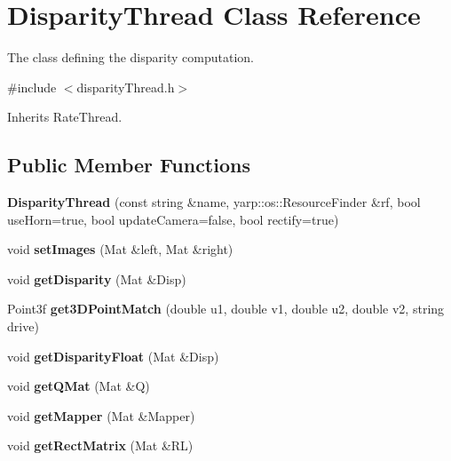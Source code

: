 \section{Disparity\+Thread Class Reference}
\label{classDisparityThread}


The class defining the disparity computation.  




{\ttfamily \#include $<$disparity\+Thread.\+h$>$}



Inherits Rate\+Thread.

\subsection*{Public Member Functions}
\begin{DoxyCompactItemize}
\item 
{\bfseries Disparity\+Thread} (const string \&name, yarp\+::os\+::\+Resource\+Finder \&rf, bool use\+Horn=true, bool update\+Camera=false, bool rectify=true)\label{classDisparityThread_ab53d3046d1397fb7c0eef512e1aae683}

\item 
void {\bfseries set\+Images} (Mat \&left, Mat \&right)\label{classDisparityThread_a91ce8f5117613ee0863fa21b0f1347b4}

\item 
void {\bfseries get\+Disparity} (Mat \&Disp)\label{classDisparityThread_a9d7c5ff0ddc84fbc74f78e6bc77c8297}

\item 
Point3f {\bfseries get3\+D\+Point\+Match} (double u1, double v1, double u2, double v2, string drive)\label{classDisparityThread_ae499c13ea55662aa612781d0d7488741}

\item 
void {\bfseries get\+Disparity\+Float} (Mat \&Disp)\label{classDisparityThread_aadcaf0193ce0c9418392803c77725efc}

\item 
void {\bfseries get\+Q\+Mat} (Mat \&Q)\label{classDisparityThread_a0c5d331cc596e81ba9bfb67770a67fa7}

\item 
void {\bfseries get\+Mapper} (Mat \&Mapper)\label{classDisparityThread_af7d1aee791ada6fdf79be8bf8e40e260}

\item 
void {\bfseries get\+Rect\+Matrix} (Mat \&R\+L)\label{classDisparityThread_a0c0b139ecaf7fa43a63ce6610c184288}


\end{DoxyCompactItemize}
